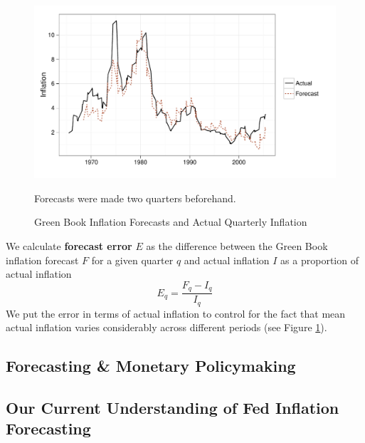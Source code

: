 \documentclass[a4paper]{article}\usepackage{graphicx, color}
\newenvironment{knitrout}{}{} %
\begin{document}
\begin{figure}[t]
    \caption{Green Book Inflation Forecasts and Actual Quarterly Inflation}
    \label{absolute}
    \begin{center}
    
\begin{knitrout}
\color{fgcolor}\includegraphics[width=0.8\linewidth]{figure/BaseInflation} 
\end{knitrout}

    
    \end{center}
    \begin{singlespace}
        {\scriptsize{Forecasts were made two quarters beforehand.}}
    \end{singlespace}
\end{figure}

We calculate {\bf{forecast error}} $E$ as the difference between the Green Book inflation forecast $F$ for a given quarter $q$ and actual inflation $I$ as a proportion of actual inflation
%
\begin{equation}
    E_{q} = \frac{F_{q} - I_{q}}{I_{q}}
\end{equation}
%
We put the error in terms of actual inflation to control for the fact that mean actual inflation varies considerably across different periods (see Figure \ref{absolute}). 

\subsection{Forecasting \& Monetary Policymaking}


\subsection{Our Current Understanding of Fed Inflation Forecasting}
\end{document}
